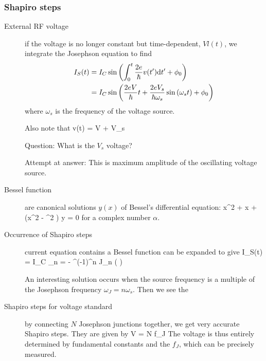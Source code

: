 \subsubsection{Shapiro steps}
\begin{description}
\item[External RF voltage] if the voltage is no longer constant but time-dependent, $Vl(t)$, we integrate the Josephson equation to find
\begin{align}
I_S(t) &= I_C \sin{\left( \int^t_0 \frac{2e}{\hbar} v(t') \mathrm{d}t' + \phi_0 \right) } \\
&= I_C \sin{\left( \frac{2eV}{\hbar} t + \frac{2eV_s}{\hbar \omega_s} \sin{\left( \omega_s t\right)} + \phi_0 \right)}
\end{align}
where $\omega_s$ is the frequency of the voltage source. 

Also note that 
\beq
v(t) = V + V_s
\eeq

Question: What is the $V_s$ voltage?  

Attempt at answer: This is maximum amplitude of the oscillating voltage source. 

\item[Bessel function] are canonical solutions $y(x)$ of Bessel's differential equation:
\beq
x^2  + x  + (x^2 - \alpha^2 ) y = 0
\eeq
for a complex number $\alpha$. 

\item[Occurrence of Shapiro steps] current equation contains a Bessel function can be expanded to give
\beq
I_S(t) = I_C \sum_{n = - \infty}^\infty (-1)^n J_n \left(  \right) 
\eeq

An interesting solution occurs when the source frequency is a multiple of the Josephson frequency $\omega_J = n \omega_s$. Then we see the 

\item[Shapiro steps for voltage standard] by connecting $N$ Josephson junctions together, we get very accurate Shapiro steps. They are given by 
\beq
V  = N  f_J
\eeq
The voltage is thus entirely determined by fundamental constants and the $f_J$, which can be precisely measured. 

\end{description}

